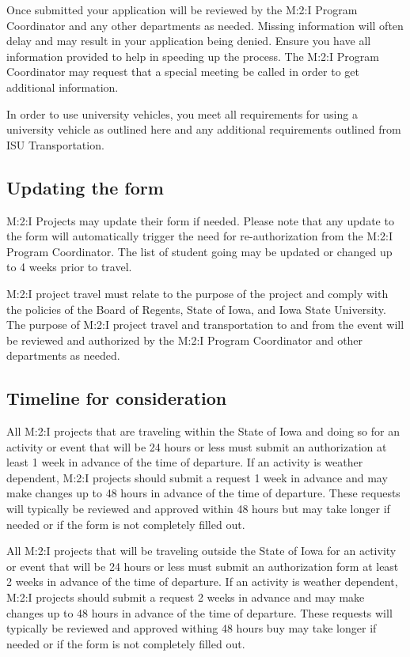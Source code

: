 {Once submitted your application will be reviewed by the M:2:I Program Coordinator and any other departments as needed.  Missing information will often delay and may result in your application being denied.  Ensure you have all information provided to help in speeding up the process.  The M:2:I Program Coordinator may request that a special meeting be called in order to get additional information.

In order to use university vehicles, you meet all requirements for using a university vehicle as outlined here and any additional requirements outlined from ISU Transportation.

\subsection{Updating the form}
M:2:I Projects may update their form if needed.  Please note that any update to the form will automatically trigger the need for re-authorization from the M:2:I Program Coordinator.  The list of student going may be updated or changed up to 4 weeks prior to travel.  

M:2:I project travel must relate to the purpose of the project and comply with the policies of the Board of Regents, State of Iowa, and Iowa State University. The purpose of M:2:I project travel and transportation to and from the event will be reviewed and authorized by the M:2:I Program Coordinator and other departments as needed. 

\subsection{Timeline for consideration}

All M:2:I projects that are traveling within the State of Iowa and doing so for an activity or event that will be 24 hours or less must submit an authorization at least 1 week in advance of the time of departure.  If an activity is weather dependent, M:2:I projects should submit a request 1 week in advance and may make changes up to 48 hours in advance of the time of departure.  These requests will typically be reviewed and approved within 48 hours but may take longer if needed or if the form is not completely filled out.

All M:2:I projects that will be traveling outside the State of Iowa for an activity or event that will be 24 hours or less must submit an authorization form at least 2 weeks in advance of the time of departure.  If an activity is weather dependent, M:2:I projects should submit a request 2 weeks in advance and may make changes up to 48 hours in advance of the time of departure.  These requests will typically be reviewed and approved withing 48 hours buy may take longer if needed or if the form is not completely filled out.

}
